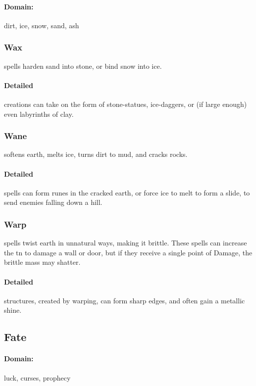 \begin{multicols}{2}
\paragraph{Domain:}
dirt, ice, snow, sand, ash

\subsubsection{Wax}
spells harden sand into stone, or bind snow into ice.

\paragraph{Detailed}
creations can take on the form of stone-statues, ice-daggers, or (if large enough) even labyrinths of clay.

\subsubsection{Wane}
softens earth, melts ice, turns dirt to mud, and cracks rocks.

\paragraph{Detailed}
spells can form runes in the cracked earth, or force ice to melt to form a slide, to send enemies falling down a hill.

\subsubsection{Warp}
spells twist earth in unnatural ways, making it brittle.
These spells can increase the \gls{tn} to damage a wall or door, but if they receive a single point of Damage, the brittle mass may shatter.

\paragraph{Detailed}
structures, created by warping, can form sharp edges, and often gain a metallic shine.

\subsection{Fate}
\paragraph{Domain:}
luck, curses, prophecy


\end{multicols}
